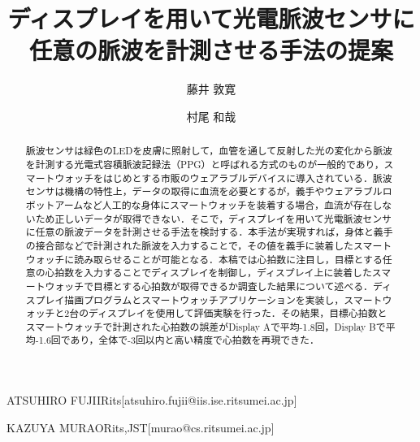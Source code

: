 \documentclass[Japanese,noauthor]{dicomopapers}
\begin{document}
\title{ディスプレイを用いて光電脈波センサに\\任意の脈波を計測させる手法の提案}


\author{藤井 敦寛}{ATSUHIRO FUJII}{Rits}[atsuhiro.fujii@iis.ise.ritsumei.ac.jp]
\author{村尾 和哉}{KAZUYA MURAO}{Rits,JST}[murao@cs.ritsumei.ac.jp]

\begin{abstract}
  脈波センサは緑色のLEDを皮膚に照射して，血管を通して反射した光の変化から脈波を計測する光電式容積脈波記録法（PPG）と呼ばれる方式のものが一般的であり，スマートウォッチをはじめとする市販のウェアラブルデバイスに導入されている．脈波センサは機構の特性上，データの取得に血流を必要とするが，義手やウェアラブルロボットアームなど人工的な身体にスマートウォッチを装着する場合，血流が存在しないため正しいデータが取得できない．そこで，ディスプレイを用いて光電脈波センサに任意の脈波データを計測させる手法を検討する．本手法が実現すれば，身体と義手の接合部などで計測された脈波を入力することで，その値を義手に装着したスマートウォッチに読み取らせることが可能となる．本稿では心拍数に注目し，目標とする任意の心拍数を入力することでディスプレイを制御し，ディスプレイ上に装着したスマートウォッチで目標とする心拍数が取得できるか調査した結果について述べる．ディスプレイ描画プログラムとスマートウォッチアプリケーションを実装し，スマートウォッチと2台のディスプレイを使用して評価実験を行った．その結果，目標心拍数とスマートウォッチで計測された心拍数の誤差がDisplay Aで平均-1.8回，Display Bで平均-1.6回であり，全体で-3回以内と高い精度で心拍数を再現できた．
\end{abstract}

\maketitle

\end{document}

